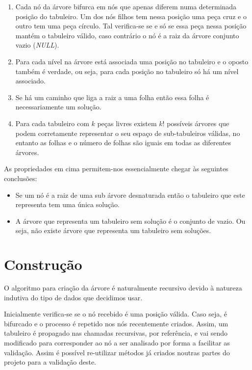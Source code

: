 \documentclass[a4paper]{report} %
\begin{document}
\begin{enumerate}
    \item \label{itm:first} Cada nó da árvore bifurca em nós que apenas diferem numa determinada posição do tabuleiro. Um dos nós filhos tem nessa posição uma peça cruz e o outro tem uma peça círculo. Tal verifica-se se e só se essa peça nessa posição mantém o tabuleiro válido, caso contrário o nó é a raiz da árvore conjunto vazio (\textit{NULL}). 
    \item \label{itm:second} Para cada nível na árvore está associada uma posição no tabuleiro e o oposto também é verdade, ou seja, para cada posição no tabuleiro só há um nível associado.
    \item \label{itm:third} Se há um caminho que liga a raiz a uma folha então essa folha é necessariamente um solução.
    \item \label{itm:fourth} Para cada tabuleiro com $k$ peças livres existem $k!$ possíveis árvores que podem corretamente representar o seu espaço de sub-tabuleiros válidas, no entanto as folhas e o número de folhas são iguais em todas as diferentes árvores.
\end{enumerate}

As propriedades em cima permitem-nos essencialmente chegar às seguintes conclusões:

\begin{itemize}
    \item Se um nó é a raiz de uma sub árvore desnaturada então o tabuleiro que este representa tem uma única solução.
    \item A árvore que representa um tabuleiro sem solução é o conjunto de vazio. Ou seja, não existe árvore que representa um tabuleiro sem soluções.
\end{itemize}

\newpage

\section{Construção}

O algoritmo para criação da árvore é naturalmente recursivo devido à natureza indutiva do tipo de dados que decidimos usar.

Inicialmente verifica-se se o nó recebido é uma posição válida. Caso seja, é bifurcado e o processo é repetido nos nós recentemente criados. Assim, um tabuleiro é propagado nas chamadas recursivas, por referência, e vai sendo modificado para corresponder ao nó a ser analisado por forma a facilitar as validação.  Assim é possível re-utilizar métodos já criados noutras partes do projeto para a validação deste.
\end{document}
